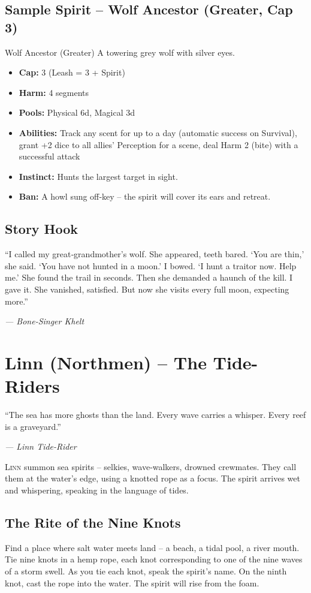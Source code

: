 \documentclass[10pt,a5paper]{book}
\begin{document}
\subsection*{Sample Spirit – Wolf Ancestor (Greater, Cap 3)}
\begin{spiritcard}{Wolf Ancestor (Greater)}
A towering grey wolf with silver eyes.
\begin{itemize}
    \item \textbf{Cap:} 3 (Leash = 3 + Spirit)
    \item \textbf{Harm:} 4 segments
    \item \textbf{Pools:} Physical 6d, Magical 3d
    \item \textbf{Abilities:} Track any scent for up to a day (automatic success on Survival), grant +2 dice to all allies’ Perception for a scene, deal Harm 2 (bite) with a successful attack
    \item \textbf{Instinct:} Hunts the largest target in sight.
    \item \textbf{Ban:} A howl sung off‑key – the spirit will cover its ears and retreat.
\end{itemize}
\end{spiritcard}

\subsection*{Story Hook}
\epigraph{“I called my great‑grandmother’s wolf. She appeared, teeth bared. ‘You are thin,’ she said. ‘You have not hunted in a moon.’ I bowed. ‘I hunt a traitor now. Help me.’ She found the trail in seconds. Then she demanded a haunch of the kill. I gave it. She vanished, satisfied. But now she visits every full moon, expecting more.”}{\textit{— Bone-Singer Khelt}}

\clearpage

\section{Linn (Northmen) – The Tide-Riders}
\epigraph{“The sea has more ghosts than the land. Every wave carries a whisper. Every reef is a graveyard.”}{\textit{— Linn Tide-Rider}}

\lettrine{L}{inn} summon sea spirits – selkies, wave‑walkers, drowned crewmates. They call them at the water’s edge, using a knotted rope as a focus. The spirit arrives wet and whispering, speaking in the language of tides.

\subsection*{The Rite of the Nine Knots}
Find a place where salt water meets land – a beach, a tidal pool, a river mouth. Tie nine knots in a hemp rope, each knot corresponding to one of the nine waves of a storm swell. As you tie each knot, speak the spirit’s name. On the ninth knot, cast the rope into the water. The spirit will rise from the foam.
\end{document}
